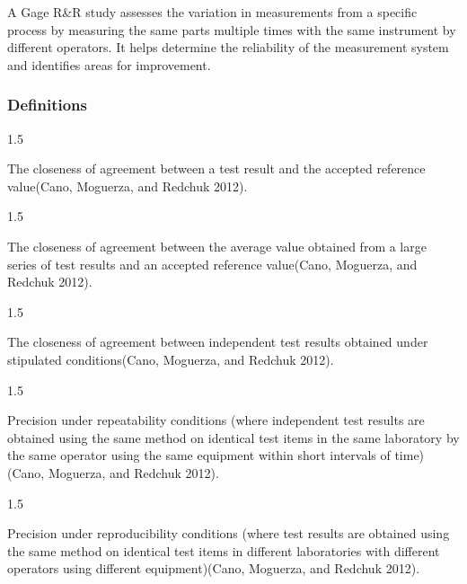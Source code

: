 \documentclass[
  a4paper,
]{scrbook}
\providecommand{\tightlist}{%
  \setlength{\itemsep}{0pt}\setlength{\parskip}{0pt}}\usepackage{longtable,booktabs,array}
\let\olddescription\description
\let\endolddescription\enddescription
\renewenvironment{description}{
          \begin{spacing}{1.5}\olddescription
        }{
          \endolddescription\end{spacing}
        }
\begin{document}
A Gage R\&R study assesses the variation in measurements from a specific
process by measuring the same parts multiple times with the same
instrument by different operators. It helps determine the reliability of
the measurement system and identifies areas for improvement.

\subsubsection{Definitions}\label{definitions}

\begin{description}
\tightlist
\item[Accuracy]
The closeness of agreement between a test result and the accepted
reference value(Cano, Moguerza, and Redchuk 2012).
\end{description}

\begin{description}
\tightlist
\item[Trueness]
The closeness of agreement between the average value obtained from a
large series of test results and an accepted reference value(Cano,
Moguerza, and Redchuk 2012).
\end{description}

\begin{description}
\tightlist
\item[Precision]
The closeness of agreement between independent test results obtained
under stipulated conditions(Cano, Moguerza, and Redchuk 2012).
\end{description}

\begin{description}
\tightlist
\item[Repeatability]
Precision under repeatability conditions (where independent test results
are obtained using the same method on identical test items in the same
laboratory by the same operator using the same equipment within short
intervals of time)(Cano, Moguerza, and Redchuk 2012).
\end{description}

\begin{description}
\tightlist
\item[Reproducibility]
Precision under reproducibility conditions (where test results are
obtained using the same method on identical test items in different
laboratories with different operators using different equipment)(Cano,
Moguerza, and Redchuk 2012).
\end{description}
\end{document}
